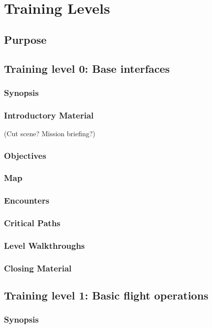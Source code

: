 \section{Training Levels}
\subsection{Purpose}

\subsection{Training level 0: Base interfaces}
\subsubsection{Synopsis}
\subsubsection{Introductory Material}
 (Cut scene?  Mission briefing?)
\subsubsection{Objectives}
\subsubsection{Map}
\subsubsection{Encounters}
\subsubsection{Critical Paths}
\subsubsection{Level Walkthroughs}
\subsubsection{Closing Material}

\subsection{Training level 1: Basic flight operations}
\subsubsection{Synopsis}
